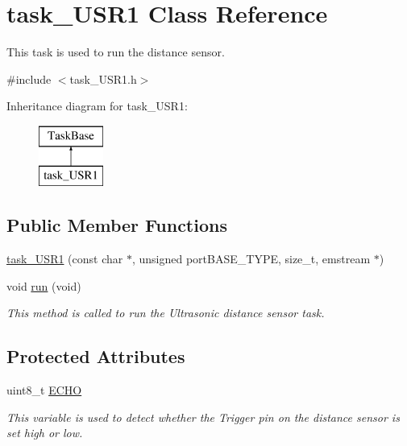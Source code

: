 \hypertarget{classtask__USR1}{}\section{task\+\_\+\+U\+S\+R1 Class Reference}
\label{classtask__USR1}


This task is used to run the distance sensor.  




{\ttfamily \#include $<$task\+\_\+\+U\+S\+R1.\+h$>$}

Inheritance diagram for task\+\_\+\+U\+S\+R1\+:\begin{figure}[H]
\begin{center}
\leavevmode
\includegraphics[height=2.000000cm]{classtask__USR1}
\end{center}
\end{figure}
\subsection*{Public Member Functions}
\begin{DoxyCompactItemize}
\item 
\mbox{\hyperlink{classtask__USR1_a09b56d4b1411901f63f762174266ecfa}{task\+\_\+\+U\+S\+R1}} (const char $\ast$, unsigned port\+B\+A\+S\+E\+\_\+\+T\+Y\+PE, size\+\_\+t, emstream $\ast$)
\item 
void \mbox{\hyperlink{classtask__USR1_a95b84a7b7f293a56470b74eb541fe346}{run}} (void)
\begin{DoxyCompactList}\small\item\em This method is called to run the Ultrasonic distance sensor task. \end{DoxyCompactList}\end{DoxyCompactItemize}
\subsection*{Protected Attributes}
\begin{DoxyCompactItemize}
\item 
\mbox{\label{classtask__USR1_a306766d3d24e1682f19c2e5ee4c3d8ce}} 
uint8\+\_\+t \mbox{\hyperlink{classtask__USR1_a306766d3d24e1682f19c2e5ee4c3d8ce}{E\+C\+HO}}
\begin{DoxyCompactList}\small\item\em This variable is used to detect whether the Trigger pin on the distance sensor is set high or low. \end{DoxyCompactList}\end{DoxyCompactItemize}



